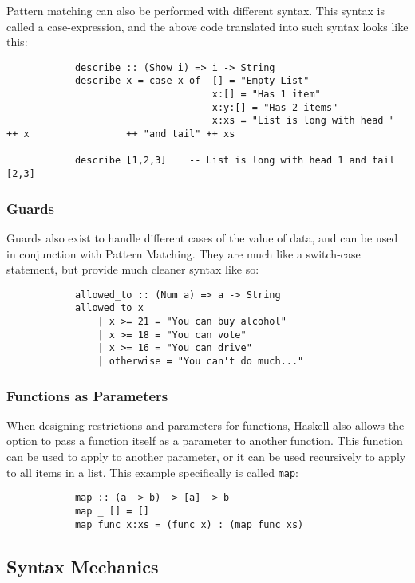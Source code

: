 \documentclass{article}
\begin{document}
        \medskip\noindent
        Pattern matching can also be performed with different syntax. This syntax is called a case-expression, and the above code translated into such syntax looks like this:
        \begin{lstlisting}
            describe :: (Show i) => i -> String
            describe x = case x of  [] = "Empty List"
                                    x:[] = "Has 1 item"
                                    x:y:[] = "Has 2 items"
                                    x:xs = "List is long with head " ++ x                 ++ "and tail" ++ xs
            
            describe [1,2,3]    -- List is long with head 1 and tail [2,3]
        \end{lstlisting}
         
        
        \subsubsection{Guards}
        Guards also exist to handle different cases of the value of data, and can be used in conjunction with Pattern Matching. They are much like a switch-case statement, but provide much cleaner syntax like so:
        \begin{lstlisting}
            allowed_to :: (Num a) => a -> String
            allowed_to x
                | x >= 21 = "You can buy alcohol"
                | x >= 18 = "You can vote"
                | x >= 16 = "You can drive"
                | otherwise = "You can't do much..."
        \end{lstlisting}
        
        \subsubsection{Functions as Parameters}
        When designing restrictions and parameters for functions, Haskell also allows the option to pass a function itself as a parameter to another function. This function can be used to apply to another parameter, or it can be used recursively to apply to all items in a list. This example specifically is called \lstinline{map}:
        \begin{lstlisting}
            map :: (a -> b) -> [a] -> b
            map _ [] = []
            map func x:xs = (func x) : (map func xs)
        \end{lstlisting}
        
    \subsection{Syntax Mechanics}
        
\end{document}
